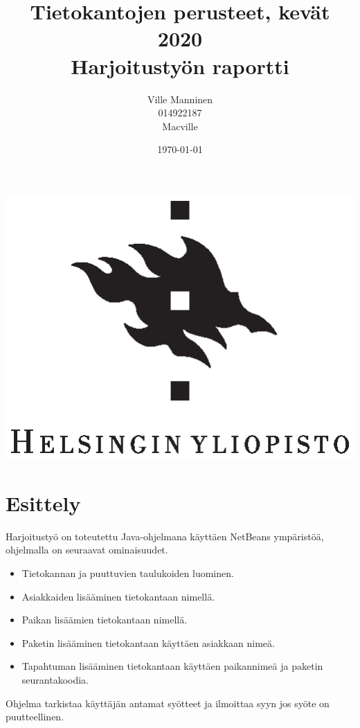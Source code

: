 \documentclass[12pt,a4paper]{article}
\begin{document}
\title{Tietokantojen perusteet, kevät 2020 \\
Harjoitustyön raportti}
\author{Ville Manninen \\014922187 \\Macville}
\date{\today}
\clearpage\maketitle
\begin{center}
\vspace{2cm}
\includegraphics{university-of-helsinki-2.eps} 
\end{center}
\thispagestyle{empty}

\newpage
\tableofcontents
\newpage
\section{Esittely}
Harjoitustyö on toteutettu Java-ohjelmana käyttäen NetBeans ympäristöä, ohjelmalla on seuraavat ominaisuudet.
\begin{itemize}
\item Tietokannan ja puuttuvien taulukoiden luominen.
\item Asiakkaiden lisääminen tietokantaan nimellä.
\item Paikan lisäämien tietokantaan nimellä.
\item Paketin lisääminen tietokantaan käyttäen asiakkaan nimeä.
\item Tapahtuman lisääminen tietokantaan käyttäen paikannimeä ja paketin seurantakoodia.

\end{itemize}
Ohjelma tarkistaa käyttäjän antamat syötteet ja ilmoittaa syyn jos syöte on puutteellinen.
\end{document}
